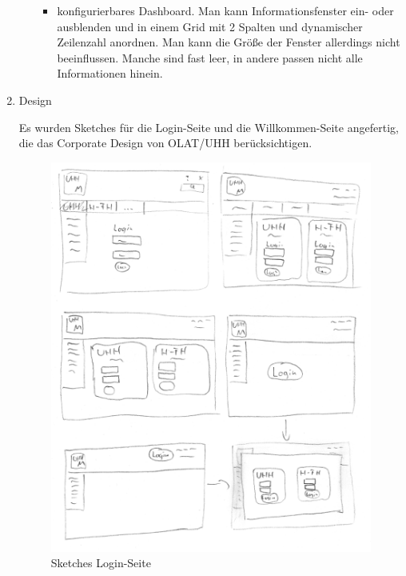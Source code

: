\documentclass[a4paper,10pt]{article}
\begin{document}
\begin{enumerate}
\begin{enumerate}
\begin{itemize}
\item konfigurierbares Dashboard. Man kann Informationsfenster ein- oder ausblenden und in einem Grid mit 2 Spalten und dynamischer Zeilenzahl anordnen. Man kann die Größe der Fenster allerdings nicht beeinflussen. Manche sind fast leer, in andere passen nicht alle Informationen hinein.
\end{itemize}
\end{enumerate}



\newpage
\item Design

Es wurden Sketches für die Login-Seite und die Willkommen-Seite angefertig, die das Corporate Design von OLAT/UHH berücksichtigen.
\begin{figure}[H]
	\centering
	\includegraphics[width=1.0\textwidth]{Sketches-Login.png} 
	\caption{Sketches Login-Seite}
	\label{fig1}
\end{figure}
\begin{figure}[H]
	\centering

\end{figure}
\end{enumerate}
\end{document}
